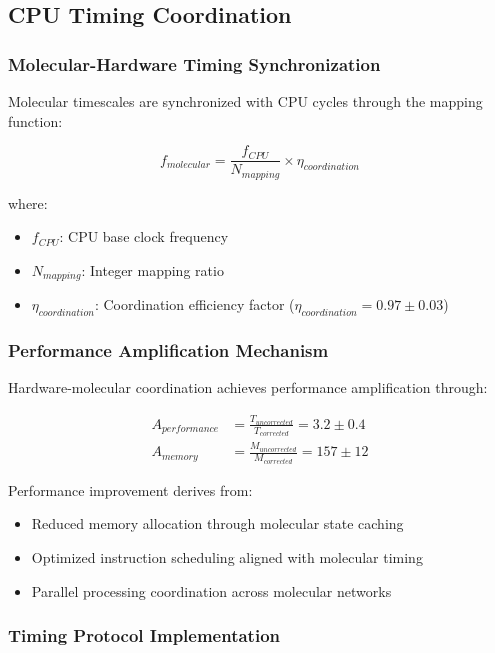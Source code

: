 \subsection{CPU Timing Coordination}

\subsubsection{Molecular-Hardware Timing Synchronization}

Molecular timescales are synchronized with CPU cycles through the mapping function:

\begin{equation}
f_{molecular} = \frac{f_{CPU}}{N_{mapping}} \times \eta_{coordination}
\end{equation}

where:
\begin{itemize}
\item $f_{CPU}$: CPU base clock frequency
\item $N_{mapping}$: Integer mapping ratio
\item $\eta_{coordination}$: Coordination efficiency factor ($\eta_{coordination} = 0.97 \pm 0.03$)
\end{itemize}

\subsubsection{Performance Amplification Mechanism}

Hardware-molecular coordination achieves performance amplification through:

\begin{align}
A_{performance} &= \frac{T_{uncorrected}}{T_{corrected}} = 3.2 \pm 0.4 \\
A_{memory} &= \frac{M_{uncorrected}}{M_{corrected}} = 157 \pm 12
\end{align}

Performance improvement derives from:
\begin{itemize}
\item Reduced memory allocation through molecular state caching
\item Optimized instruction scheduling aligned with molecular timing
\item Parallel processing coordination across molecular networks
\end{itemize}

\subsubsection{Timing Protocol Implementation}

